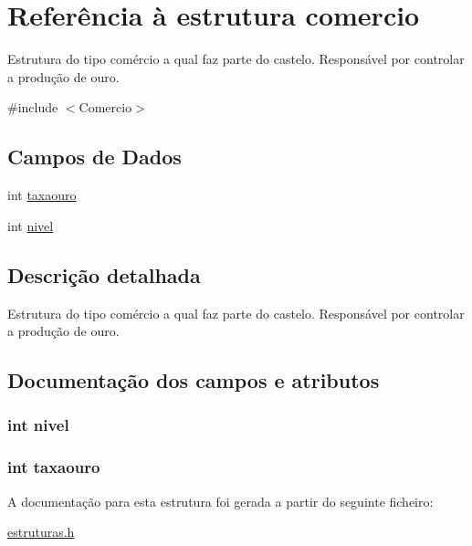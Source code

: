 \hypertarget{structcomercio}{\section{\-Referência à estrutura comercio}
\label{structcomercio}
}


\-Estrutura do tipo comércio a qual faz parte do castelo. \-Responsável por controlar a produção de ouro.  




{\ttfamily \#include $<$\-Comercio$>$}

\subsection*{\-Campos de \-Dados}
\begin{DoxyCompactItemize}
\item 
int \hyperlink{structcomercio_ad0eebe3dcaa5b98c97b0c563b0554860}{taxaouro}
\item 
int \hyperlink{structcomercio_afafcd32854d6f6b1c4cd3cca8f1315a7}{nivel}
\end{DoxyCompactItemize}


\subsection{\-Descrição detalhada}
\-Estrutura do tipo comércio a qual faz parte do castelo. \-Responsável por controlar a produção de ouro. 

\subsection{\-Documentação dos campos e atributos}
\hypertarget{structcomercio_afafcd32854d6f6b1c4cd3cca8f1315a7}{
\subsubsection[{nivel}]{\setlength{\rightskip}{0pt plus 5cm}int {\bf nivel}}}\label{structcomercio_afafcd32854d6f6b1c4cd3cca8f1315a7}
\hypertarget{structcomercio_ad0eebe3dcaa5b98c97b0c563b0554860}{
\subsubsection[{taxaouro}]{\setlength{\rightskip}{0pt plus 5cm}int {\bf taxaouro}}}\label{structcomercio_ad0eebe3dcaa5b98c97b0c563b0554860}


\-A documentação para esta estrutura foi gerada a partir do seguinte ficheiro\-:\begin{DoxyCompactItemize}
\item 
\hyperlink{estruturas_8h}{estruturas.\-h}\end{DoxyCompactItemize}
